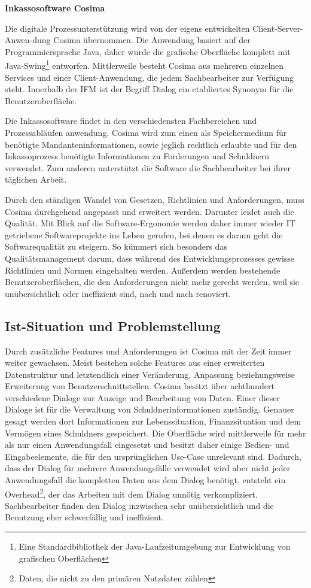 \textbf{Inkassosoftware Cosima}

Die digitale Prozessunterstützung wird von der eigens entwickelten Client-Server-Anwen-dung Cosima übernommen. Die Anwendung basiert auf der Programmiersprache Java, daher wurde die grafische Oberfläche komplett mit Java-Swing\footnote{Eine Standardbibliothek der Java-Laufzeitumgebung zur Entwicklung von grafischen Oberflächen} entworfen. Mittlerweile besteht Cosima aus mehreren einzelnen Services und einer Client-Anwendung, die jedem Sachbearbeiter zur Verfügung steht. Innerhalb der \gls{IFM} ist der Begriff Dialog ein etabliertes Synonym für die Benutzeroberfläche.

Die Inkassosoftware findet in den verschiedensten Fachbereichen und Prozessabläufen anwendung. Cosima wird zum einen als Speichermedium für benötigte Mandanteninformationen, sowie jeglich rechtlich erlaubte und für den Inkassoprozess benötigte Informationen zu Forderungen und Schuldnern verwendet. Zum anderen unterstützt die Software die Sachbearbeiter bei ihrer täglichen Arbeit. 

Durch den ständigen Wandel von Gesetzen, Richtlinien und Anforderungen, muss Cosima durchgehend angepasst und erweitert werden. Darunter leidet auch die Qualität. Mit Blick auf die Software-Ergonomie werden daher immer wieder IT getriebene Softwareprojekte ins Leben gerufen, bei denen es darum geht die Softwarequalität zu steigern. So kümmert sich besonders das Qualitätsmanagement darum, dass während des Entwicklungsprozesses gewisse Richtlinien und Normen eingehalten werden. Außerdem werden bestehende Benutzeroberflächen, die den Anforderungen nicht mehr gerecht werden, weil sie unübersichtlich oder ineffizient sind, nach und nach renoviert. 


\subsection{Ist-Situation und Problemstellung}
Durch zusätzliche Features und Anforderungen ist Cosima mit der Zeit immer weiter gewachsen. Meist bestehen solche Features aus einer erweiterten Datenstruktur und letztendlich einer Veränderung, Anpassung beziehungsweise Erweiterung von Benutzerschnittstellen. Cosima besitzt über achthundert verschiedene Dialoge zur Anzeige und Bearbeitung von Daten. Einer dieser Dialoge ist für die Verwaltung von Schuldnerinformationen zuständig. Genauer gesagt werden dort Informationen zur Lebenssituation, Finanzsituation und dem Vermögen eines Schuldners gespeichert. Die Oberfläche wird mittlerweile für mehr als nur einen Anwendungsfall eingesetzt und besitzt daher einige Bedien- und Eingabeelemente, die für den ursprünglichen Use-Case unrelevant sind. Dadurch, dass der Dialog für mehrere Anwendungsfälle verwendet wird aber nicht jeder Anwendungsfall die kompletten Daten aus dem Dialog benötigt, entsteht ein Overhead\footnote{Daten, die nicht zu den primären Nutzdaten zählen}, der das Arbeiten mit dem Dialog unnötig verkompliziert. Sachbearbeiter finden den Dialog inzwischen sehr unübersichtlich und die Benutzung eher schwerfällig und ineffizient.

